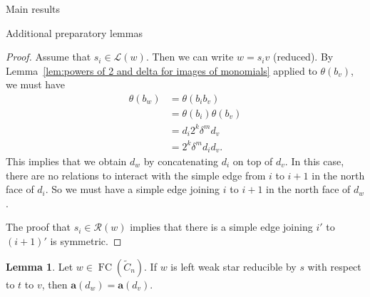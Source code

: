 \documentclass[11pt]{amsart}
\theoremstyle{definition}
\newtheorem{lemma}[theorem]{Lemma}
\numberwithin{equation}{section}
\newcommand{\C}{\widetilde{C}}
\renewcommand{\a}{\mathbf{a}}
\renewcommand{\L}{\mathcal{L}}
\newcommand{\R}{\mathcal{R}}
\renewcommand{\(}{\left(}
\renewcommand{\)}{\right)}
\DeclareMathOperator{\FC}{FC}
\begin{document}
\begin{section}{Main results}
\begin{subsection}{Additional preparatory lemmas}
\begin{proof}
Assume that $s_{i} \in \L(w)$.  Then we can write $w=s_{i}v$ (reduced).  By Lemma~\ref{lem:powers of 2 and delta for images of monomials} applied to $\theta(b_{v})$, we must have
{\allowdisplaybreaks
\begin{align*}
\theta(b_{w})&=\theta(b_{i}b_{v})\\
&=\theta(b_{i})\theta(b_{v})\\
&=d_{i} 2^{k}\delta^{m}d_{v}\\
&=2^{k}\delta^{m}d_{i}d_{v}.
\end{align*}}%
This implies that we obtain $d_{w}$ by concatenating $d_{i}$ on top of $d_{v}$.  In this case, there are no relations to interact with the simple edge from $i$ to $i+1$ in the north face of $d_{i}$.  So we must have a simple edge joining $i$ to $i+1$ in the north face of $d_{w}$.  

The proof that $s_{i} \in \R(w)$ implies that there is a simple edge joining $i'$ to $(i+1)'$ is symmetric.
\end{proof}

\begin{lemma}\label{lem:weak star preserve a-value}
Let $w \in \FC(\C_{n})$. If $w$ is left weak star reducible by $s$ with respect to $t$ to $v$, then $\a(d_{w})=\a(d_{v})$.
\end{lemma}


\end{subsection}
\end{section}
\end{document}
